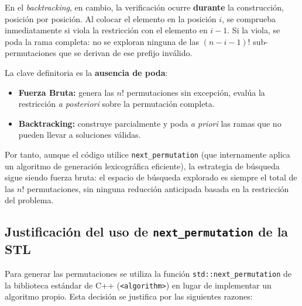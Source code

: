 \documentclass[12pt, a4paper]{article}
\begin{document}
En el \textit{backtracking}, en cambio, la verificación ocurre \textbf{durante} la
construcción, posición por posición. Al colocar el elemento en la posición $i$, se
comprueba inmediatamente si viola la restricción con el elemento en $i-1$. Si la
viola, se poda la rama completa: no se exploran ninguna de las $(n-i-1)!$
sub-permutaciones que se derivan de ese prefijo inválido.

La clave definitoria es la \textbf{ausencia de poda}:

\begin{itemize}
  \item \textbf{Fuerza Bruta:} genera las $n!$ permutaciones sin excepción, evalúa la
        restricción \textit{a posteriori} sobre la permutación completa.
  \item \textbf{Backtracking:} construye parcialmente y poda \textit{a priori} las ramas
        que no pueden llevar a soluciones válidas.
\end{itemize}

Por tanto, aunque el código utilice \texttt{next\_permutation} (que internamente aplica
un algoritmo de generación lexicográfica eficiente), la estrategia de búsqueda sigue
siendo fuerza bruta: el espacio de búsqueda explorado es siempre el total de las $n!$
permutaciones, sin ninguna reducción anticipada basada en la restricción del problema.

\subsection{Justificación del uso de \texttt{next\_permutation} de la STL}

Para generar las permutaciones se utiliza la función \texttt{std::next\_permutation}
de la biblioteca estándar de C++ (\texttt{<algorithm>}) en lugar de implementar un
algoritmo propio. Esta decisión se justifica por las siguientes razones:
\end{document}
